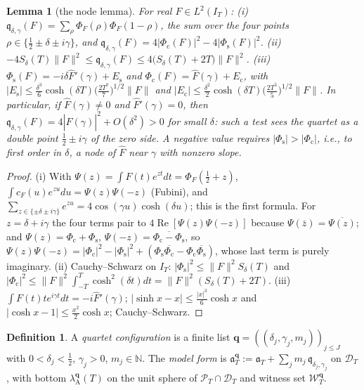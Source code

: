 \documentclass[11pt]{amsart}
\newtheorem{lemma}[theorem]{Lemma}
\theoremstyle{definition}
\newtheorem{definition}[theorem]{Definition}
\theoremstyle{remark}
\newcommand{\N}{\mathbb N}
\newcommand{\Rel}{\operatorname{Re}}
\newcommand{\PT}{\mathcal P_T}
\newcommand{\IT}{I_T}
\newcommand{\Fh}{\widehat F}
\newcommand{\cF}{c_F}
\begin{document}
\begin{lemma}[the node lemma]\label{lem:wit-node}
For real $F\in L^2(\IT)$:
\emph{(i)} $\mathfrak q_{\delta,\gamma}(F)=\sum_{\rho}\Phi_F(\rho)\Phi_F(1-\rho)$, the sum over the four points
$\rho\in\{\frac12\pm\delta\pm i\gamma\}$, and $\mathfrak q_{\delta,\gamma}(F)=4|\Phi_{\mathrm c}(F)|^2-4|\Phi_{\mathrm s}(F)|^2$.
\emph{(ii)} $-4S_\delta(T)\|F\|^2\le\mathfrak q_{\delta,\gamma}(F)\le4\big(S_\delta(T)+2T\big)\|F\|^2$.
\emph{(iii)} $\Phi_{\mathrm s}(F)=-i\delta\Fh'(\gamma)+E_{\mathrm s}$ and $\Phi_{\mathrm c}(F)=\Fh(\gamma)+E_{\mathrm c}$, with
$|E_{\mathrm s}|\le\frac{\delta^3}6\cosh(\delta T)\big(\frac{2T^7}7\big)^{1/2}\|F\|$ and
$|E_{\mathrm c}|\le\frac{\delta^2}2\cosh(\delta T)\big(\frac{2T^5}5\big)^{1/2}\|F\|$.
In particular, if $\Fh(\gamma)\ne0$ and $\Fh'(\gamma)=0$, then $\mathfrak q_{\delta,\gamma}(F)=4|\Fh(\gamma)|^2+O(\delta^2)>0$ for small
$\delta$: such a test sees the quartet as a double point $\frac12\pm i\gamma$ of the zero side. A negative value requires
$|\Phi_{\mathrm s}|>|\Phi_{\mathrm c}|$, i.e., to first order in $\delta$, a node of $\Fh$ near $\gamma$ with nonzero slope.
\end{lemma}

\begin{proof}
(i) With $\Psi(z)=\int F(t)e^{zt}dt=\Phi_F(\frac12+z)$, $\int\cF(u)e^{zu}du=\Psi(z)\Psi(-z)$ (Fubini), and
$\sum_{z\in\{\pm\delta\pm i\gamma\}}e^{zu}=4\cos(\gamma u)\cosh(\delta u)$; this is the first formula. For $z=\delta+i\gamma$ the four
terms pair to $4\Rel[\Psi(z)\Psi(-z)]$ because $\Psi(\bar z)=\overline{\Psi(z)}$; and $\Psi(z)=\Phi_{\mathrm c}+\Phi_{\mathrm s}$,
$\Psi(-z)=\overline{\Phi_{\mathrm c}-\Phi_{\mathrm s}}$, so
$\Psi(z)\Psi(-z)=|\Phi_{\mathrm c}|^2-|\Phi_{\mathrm s}|^2+(\Phi_{\mathrm s}\overline{\Phi_{\mathrm c}}-\Phi_{\mathrm c}\overline{\Phi_{\mathrm s}})$,
whose last term is purely imaginary. (ii) Cauchy--Schwarz on $\IT$: $|\Phi_{\mathrm s}|^2\le\|F\|^2S_\delta(T)$ and
$|\Phi_{\mathrm c}|^2\le\|F\|^2\int_{-T}^T\cosh^2(\delta t)dt=\|F\|^2(S_\delta(T)+2T)$. (iii) $\int F(t)te^{i\gamma t}dt=-i\Fh'(\gamma)$;
$|\sinh x-x|\le\frac{|x|^3}6\cosh x$ and $|\cosh x-1|\le\frac{x^2}2\cosh x$; Cauchy--Schwarz.
\end{proof}

\begin{definition}\label{def:wit-model}
A \emph{quartet configuration} is a finite list $\mathbf q=((\delta_j,\gamma_j,m_j))_{j\le J}$ with $0<\delta_j<\frac12$,
$\gamma_j>0$, $m_j\in\N$. The \emph{model form} is $\mathfrak a^{\mathbf q}_T:=\mathfrak a_T+\sum_jm_j\,\mathfrak q_{\delta_j,\gamma_j}$ on
$\mathcal D_T$, with bottom $\lambda^{\mathbf q}_{\mathrm A}(T)$ on the unit sphere of $\PT\cap\mathcal D_T$ and witness set
$\mathscr W^{\mathbf q}_T$.
\end{definition}
\end{document}
